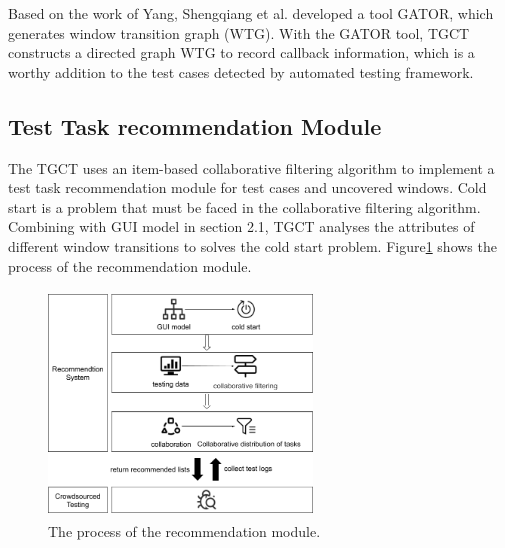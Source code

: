 Based on the work of Yang, Shengqiang et al.\cite{b5} developed a tool GATOR, which generates window transition graph (WTG). With the GATOR tool, TGCT constructs a directed graph WTG to record callback information, which is a worthy addition to the test cases detected by automated testing framework.


\subsection{Test Task recommendation Module}
The TGCT uses an item-based collaborative filtering algorithm to implement a test task recommendation module for test cases and uncovered windows. Cold start is a problem that must be faced in the collaborative filtering algorithm. Combining with GUI model in section 2.1, TGCT analyses the attributes of different window transitions to solves the cold start problem. Figure\ref{fig:recomd} shows the process of the recommendation module. 
\begin{figure}[htbp]
\centering
\centerline{\includegraphics[width=7cm,height=6cm]{fig/7.png}}
\caption{The process of the recommendation module.}
\label{fig:recomd}
\end{figure}
